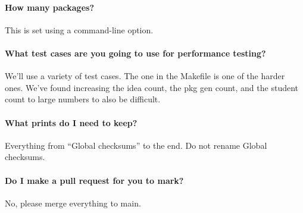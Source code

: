 \paragraph{How many packages?} This is set using a command-line option.

\paragraph{What test cases are you going to use for performance testing?} We'll use a variety of test cases. The one in the Makefile is one of the harder ones. We've found increasing the idea count, the pkg gen count, and the student count to large numbers to also be difficult.

\paragraph{What prints do I need to keep?} Everything from ``Global checksums'' to the end. Do not rename Global checksums.

\paragraph{Do I make a pull request for you to mark?} No, please merge everything to main.




